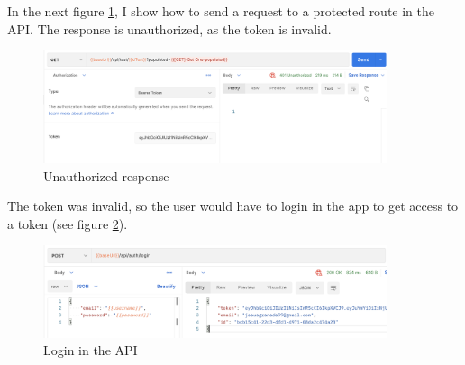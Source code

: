             In the next figure \ref{fig:user_unauthorized}, I show how to send a request to a protected route in the API. The response is unauthorized, as the token is invalid.
            \begin{figure}[H]
                \centering
                    \includegraphics[width=0.9\textwidth]{assets/unauthorized.png}
                \caption{Unauthorized response}
                \label{fig:user_unauthorized}
            \end{figure}

            The token was invalid, so the user would have to login in the app to get access to a token (see figure \ref{fig:user_login_api}).
            \begin{figure}[H]
                \centering
                    \includegraphics[width=0.9\textwidth]{assets/login.png}
                \caption{Login in the API}
                \label{fig:user_login_api}
            \end{figure}


